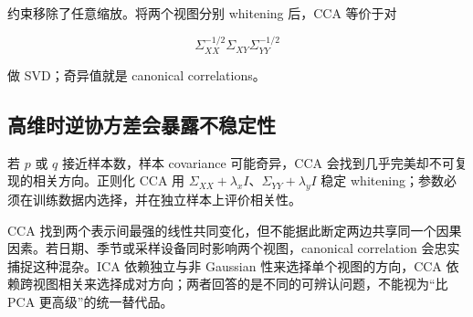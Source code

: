 约束移除了任意缩放。将两个视图分别 whitening 后，CCA 等价于对

\[
\Sigma_{XX}^{-1/2}\Sigma_{XY}\Sigma_{YY}^{-1/2}
\]

做 SVD；奇异值就是 canonical correlations。

\subsection{高维时逆协方差会暴露不稳定性}

若 \(p\) 或 \(q\) 接近样本数，样本 covariance 可能奇异，CCA 会找到几乎完美却不可复现的相关方向。正则化 CCA 用 \(\Sigma_{XX}+\lambda_xI\)、\(\Sigma_{YY}+\lambda_yI\) 稳定 whitening；参数必须在训练数据内选择，并在独立样本上评价相关性。

CCA 找到两个表示间最强的线性共同变化，但不能据此断定两边共享同一个因果因素。若日期、季节或采样设备同时影响两个视图，canonical correlation 会忠实捕捉这种混杂。ICA 依赖独立与非 Gaussian 性来选择单个视图的方向，CCA 依赖跨视图相关来选择成对方向；两者回答的是不同的可辨认问题，不能视为“比 PCA 更高级”的统一替代品。
